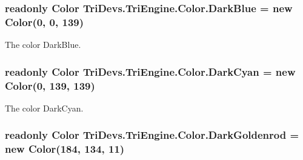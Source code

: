 \hypertarget{struct_tri_devs_1_1_tri_engine_1_1_color_af6d7f220e558723f6f9685e09ade41f9}{
\subsubsection[{Dark\-Blue}]{\setlength{\rightskip}{0pt plus 5cm}readonly {\bf Color} Tri\-Devs.\-Tri\-Engine.\-Color.\-Dark\-Blue = new {\bf Color}(0, 0, 139)\hspace{0.3cm}{\ttfamily [static]}}}\label{struct_tri_devs_1_1_tri_engine_1_1_color_af6d7f220e558723f6f9685e09ade41f9}


The color Dark\-Blue. 

\hypertarget{struct_tri_devs_1_1_tri_engine_1_1_color_a965eb1eb9d2862b670d1dc5db15454f4}{
\subsubsection[{Dark\-Cyan}]{\setlength{\rightskip}{0pt plus 5cm}readonly {\bf Color} Tri\-Devs.\-Tri\-Engine.\-Color.\-Dark\-Cyan = new {\bf Color}(0, 139, 139)\hspace{0.3cm}{\ttfamily [static]}}}\label{struct_tri_devs_1_1_tri_engine_1_1_color_a965eb1eb9d2862b670d1dc5db15454f4}


The color Dark\-Cyan. 

\hypertarget{struct_tri_devs_1_1_tri_engine_1_1_color_af19964145df54c9d2e1ae1fdd48c0e84}{
\subsubsection[{Dark\-Goldenrod}]{\setlength{\rightskip}{0pt plus 5cm}readonly {\bf Color} Tri\-Devs.\-Tri\-Engine.\-Color.\-Dark\-Goldenrod = new {\bf Color}(184, 134, 11)\hspace{0.3cm}{\ttfamily [static]}}}\label{struct_tri_devs_1_1_tri_engine_1_1_color_af19964145df54c9d2e1ae1fdd48c0e84}


